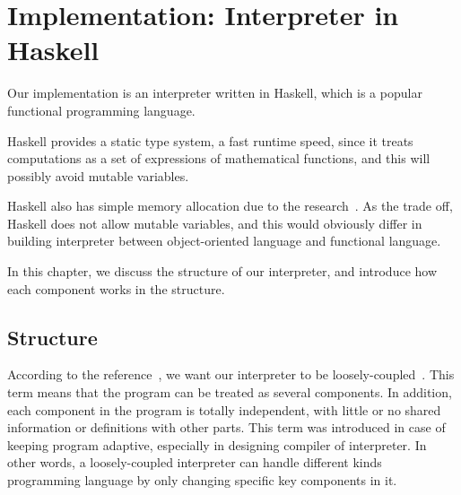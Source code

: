 \chapter{Implementation: Interpreter in Haskell}
Our implementation is an interpreter written in Haskell, which is a popular functional  programming language. 

Haskell provides a static type system, a fast runtime speed, since it treats computations as a set of expressions of mathematical functions,  and this will possibly avoid mutable variables. 

Haskell also has simple memory allocation due to the research~\cite{PIH}.
As the trade off, Haskell does not allow mutable variables, and this would obviously differ in building interpreter between object-oriented language and functional language.


In this chapter, we discuss the structure of our interpreter, and introduce how each component works in the structure.

\section{Structure}
According to the reference~\cite{WCAI}, we want our interpreter to be loosely-coupled~\cite{looseC}. This term means that the program can be treated as several components. In addition, each component in the program is totally independent, with little or no shared information or definitions with other parts.
This term was introduced in case of keeping program adaptive, especially in designing compiler of interpreter. In other words, a loosely-coupled interpreter can handle different kinds programming language by only changing specific key components in it.

